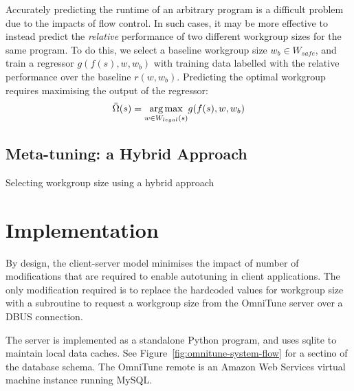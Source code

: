 Accurately predicting the runtime of an arbitrary program is a
difficult problem due to the impacts of flow control. In such cases,
it may be more effective to instead predict the \emph{relative}
performance of two different workgroup sizes for the same program. To
do this, we select a baseline workgroup size $w_b \in W_{safe}$, and
train a regressor $g(f(s),w,w_b)$ with training data labelled with the
relative performance over the baseline $r(w, w_b)$. Predicting the
optimal workgroup requires maximising the output of the regressor:
%
\begin{equation}
  \bar{\Omega}(s) = \underset{w \in W_{legal}(s)}{\operatorname*{arg\,max}} g(f(s),w,w_b)
\end{equation}
%

% 


\subsection{Meta-tuning: a Hybrid Approach}


\begin{algorithm}

\caption{Selecting workgroup size using a hybrid approach}
\label{alg:autotune-hybrid}
\end{algorithm}


\section{Implementation}

By design, the client-server model minimises the impact of number of
modifications that are required to enable autotuning in client
applications. The only modification required is to replace the
hardcoded values for workgroup size with a subroutine to request a
workgroup size from the OmniTune server over a DBUS connection.

The server is implemented as a standalone Python program, and uses
sqlite to maintain local data caches. See
Figure~\ref{fig:omnitune-system-flow} for a sectino of the database
schema. The OmniTune remote is an Amazon Web Services virtual machine
instance running MySQL.

